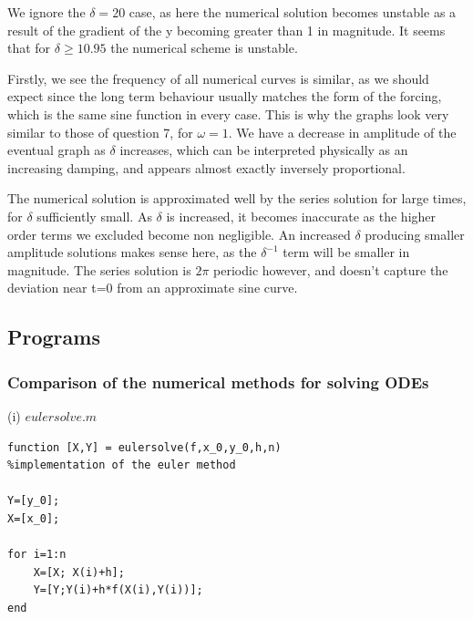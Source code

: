 \documentclass[10pt,a4paper]{report}
\begin{document}
We ignore the $\delta=20$ case, as here the numerical solution becomes unstable as a result of the gradient of the y becoming greater than 1 in magnitude. It seems that for $\delta \geq 10.95$ the numerical scheme is unstable.\par
\vspace{0.3cm}
Firstly, we see the frequency of all numerical curves is similar, as we should expect since the long term behaviour usually matches the form of the forcing, which is the same sine function in every case. This is why the graphs look very similar to those of question 7, for $\omega=1$. We have a decrease in amplitude of the eventual graph as $\delta$ increases, which can be interpreted physically as an increasing damping, and appears almost exactly inversely proportional. \par
\vspace{0.3cm}
The numerical solution is approximated well by the series solution for large times, for $\delta$ sufficiently small. As $\delta$ is increased, it becomes inaccurate as the higher order terms we excluded become non negligible. An increased $\delta$ producing smaller amplitude solutions makes sense here, as the $\delta^{-1}$ term will be smaller in magnitude. The series solution is $2\pi$ periodic however, and doesn't capture the deviation near t=0 from an approximate sine curve.\\




\newpage

\subsection*{Programs}

\vspace{1cm}

\subsubsection*{Comparison of the numerical methods for solving ODEs}

\vspace{0.5cm}

(i) $eulersolve.m$
\begin{verbatim}
function [X,Y] = eulersolve(f,x_0,y_0,h,n)
%implementation of the euler method

Y=[y_0];
X=[x_0];

for i=1:n
    X=[X; X(i)+h];
    Y=[Y;Y(i)+h*f(X(i),Y(i))];
end
\end{verbatim}
\vspace{0.5cm}
\end{document}
